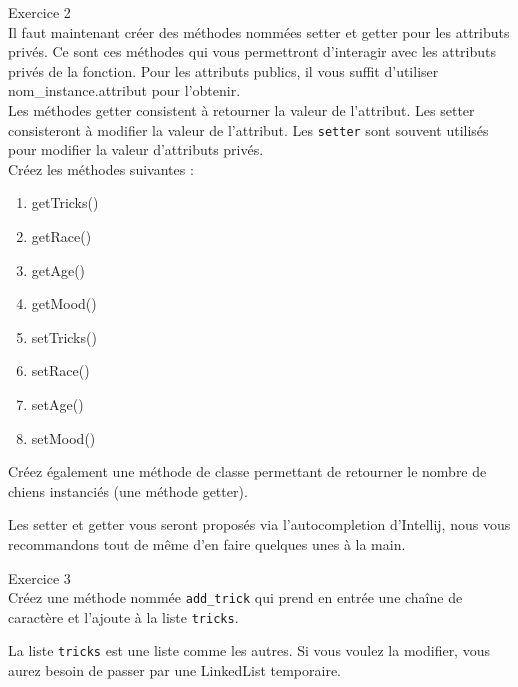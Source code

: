 \begin{Exercice}[10 minutes] Exercice 2\\
    Il faut maintenant créer des méthodes nommées setter et getter pour les attributs privés. Ce sont ces méthodes qui vous permettront d'interagir avec les attributs privés de la fonction. Pour les attributs publics, il vous suffit d'utiliser nom\_instance.attribut pour l'obtenir. \\
    
    Les méthodes getter consistent à retourner la valeur de l'attribut. Les setter consisteront à modifier la valeur de l'attribut. Les \lstinline{setter} sont souvent utilisés pour modifier la valeur d'attributs privés. \\
    
    Créez les méthodes suivantes :
    \begin{enumerate}
    \item getTricks()
    \item getRace()
    \item getAge()
    \item getMood()
    \item setTricks()
    \item setRace()
    \item setAge()
    \item setMood()
    \end{enumerate}
    
    Créez également une méthode de classe permettant de retourner le nombre de chiens instanciés (une méthode getter).
   	
\begin{conseil}
   Les setter et getter vous seront proposés via l'autocompletion d'Intellij, nous vous recommandons tout de même d'en faire quelques unes à la main.
\end{conseil}
    
\begin{solution}
	
\end{solution}
\end{Exercice}

\begin{Exercice}[5 minutes] Exercice 3\\
    Créez une méthode nommée \lstinline{add_trick} qui prend en entrée une chaîne de caractère et l'ajoute à la liste \lstinline{tricks}. \\
   	
\begin{conseil}
   La liste \lstinline{tricks} est une liste comme les autres. Si vous voulez la modifier, vous aurez besoin de passer par une LinkedList temporaire.
\end{conseil}
    
\begin{solution}
	
\end{solution}
\end{Exercice}

